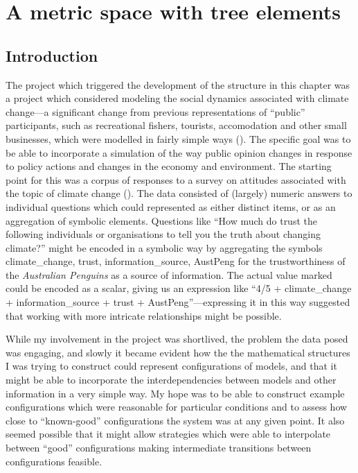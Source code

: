 \chapter[A METRIC SPACE WITH TREE ELEMENTS] {A metric space with tree elements}\label{treering}
\WeAreOn{\cfour}
\section{Introduction}
The project which triggered the development of the structure in this
chapter was a project which considered modeling the social dynamics
associated with climate change---a significant change from previous
representations of ``public'' participants, such as recreational
fishers, tourists, accomodation and other small businesses, which were
modelled in fairly simple ways (\cite{Fulton2011ningaloo,Gray2014}).
The specific goal was to be able to incorporate a simulation of the
way public opinion changes in response to policy actions and changes
in the economy and environment.  The starting point for this was a
corpus of responses to a survey on attitudes associated with the topic
of climate change (\cite{boschetti2012}). The data consisted of
(largely) numeric answers to individual questions which could
represented as either distinct items, or as an aggregation of symbolic
elements.  Questions like ``How much do trust the following
individuals or organisations to tell you the truth about changing
climate?'' might be encoded in a symbolic way by aggregating the
symbols \textsf{climate\_change, trust, information\_source, AustPeng}
for the trustworthiness of the \emph{Australian Penguins} as a source
of information. The actual value marked could be encoded as a scalar,
giving us an expression like ``\textsf{4/5 + climate\_change +
information\_source + trust + AustPeng}''---expressing it in this way
suggested that working with more intricate relationships might be
possible.

While my involvement in the project was shortlived, the problem the
data posed was engaging, and slowly it became evident how the the
mathematical structures I was trying to construct could represent
configurations of models, and that it might be able to incorporate
the interdependencies between models and other information in a very
simple way.  My hope was to be able to construct example
configurations which were reasonable for particular conditions and to
assess how close to ``known-good'' configurations the system was
at any given point.  It also seemed possible that it might allow
strategies which were able to interpolate between ``good'' 
configurations making intermediate transitions between configurations
feasible.

